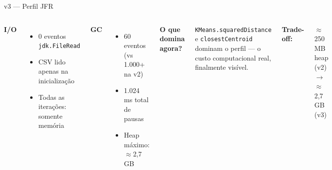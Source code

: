 \begin{frame}{v3 --- Perfil JFR}
    \begin{columns}
        \textbf{I/O}
        \begin{itemize}
            \item \alert{0 eventos \texttt{jdk.FileRead}}
            \item CSV lido apenas na inicialização
            \item Todas as iterações: somente memória
        \end{itemize}

        \bigskip
        \textbf{GC}
        \begin{itemize}
            \item 60 eventos (vs 1.000+ na v2)
            \item 1.024 ms total de pausas
            \item Heap máximo: \alert{$\approx$2,7 GB}
        \end{itemize}

        \textbf{O que domina agora?}

        \medskip
        \texttt{KMeans.squaredDistance} e \texttt{closestCentroid} dominam o
        perfil --- o custo computacional real, finalmente visível.

        \bigskip
        \textbf{Trade-off:}

        $\approx$250 MB heap (v2) $\to$ $\approx$2,7 GB (v3)
    \end{columns}
\end{frame}
